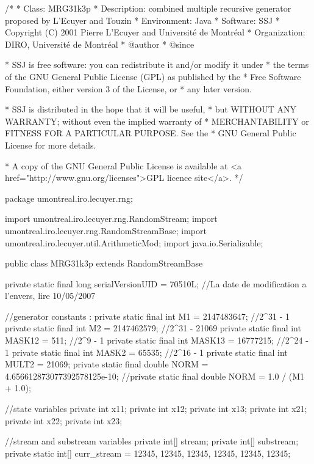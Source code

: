 \begin{code}
\begin{hide}
/*
 * Class:        MRG31k3p
 * Description:  combined multiple recursive generator proposed by L'Ecuyer and Touzin 
 * Environment:  Java
 * Software:     SSJ 
 * Copyright (C) 2001  Pierre L'Ecuyer and Université de Montréal
 * Organization: DIRO, Université de Montréal
 * @author       
 * @since

 * SSJ is free software: you can redistribute it and/or modify it under
 * the terms of the GNU General Public License (GPL) as published by the
 * Free Software Foundation, either version 3 of the License, or
 * any later version.

 * SSJ is distributed in the hope that it will be useful,
 * but WITHOUT ANY WARRANTY; without even the implied warranty of
 * MERCHANTABILITY or FITNESS FOR A PARTICULAR PURPOSE.  See the
 * GNU General Public License for more details.

 * A copy of the GNU General Public License is available at
   <a href="http://www.gnu.org/licenses">GPL licence site</a>.
 */
\end{hide}
package umontreal.iro.lecuyer.rng; \begin{hide}


import umontreal.iro.lecuyer.rng.RandomStream;
import umontreal.iro.lecuyer.rng.RandomStreamBase;
import umontreal.iro.lecuyer.util.ArithmeticMod;
import java.io.Serializable;
\end{hide}

public class MRG31k3p extends RandomStreamBase \begin{hide} {

   private static final long serialVersionUID = 70510L;
   //La date de modification a l'envers, lire 10/05/2007

   //generator constants :
   private static final int M1 = 2147483647;    //2^31 - 1
   private static final int M2 = 2147462579;    //2^31 - 21069
   private static final int MASK12 = 511;       //2^9 - 1
   private static final int MASK13 = 16777215;  //2^24 - 1
   private static final int MASK2 = 65535;      //2^16 - 1
   private static final int MULT2 = 21069;
   private static final double NORM = 4.656612873077392578125e-10;
   //private static final double NORM = 1.0 / (M1 + 1.0);

   //state variables
   private int x11;
   private int x12;
   private int x13;
   private int x21;
   private int x22;
   private int x23;

   //stream and substream variables
   private int[] stream;
   private int[] substream;
   private static int[] curr_stream = {12345, 12345, 12345,
                                       12345, 12345, 12345};

}
\end{hide}
\end{code}
